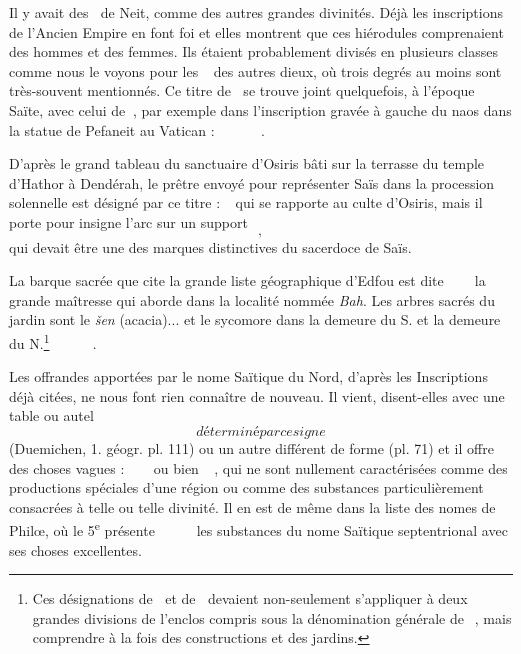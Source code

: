 \documentclass[a4paper, 11pt, oneside]{article}
\newcommand*\hieroAAAH{}
\newcommand*\hieroAAAO{}
\newcommand*\hieroAAAQ{}
\newcommand*\hieroAAAX{}
\newcommand*\hieroAABM{}
\newcommand*\hieroAABY{\raisebox{0.5ex}{}}
\newcommand*\hieroAADL{}
\newcommand*\hieroAADT{}
\newcommand*\hieroAADV{\raisebox{0.5ex}{}}
\newcommand*\hieroAAEB{}
\newcommand*\hieroAAEF{}
\newcommand*\hieroAAEK{}
\newcommand*\hieroAAEZ{}
\newcommand*\hieroAAFB{}
\newcommand*\hieroAAFH{}
\newcommand*\hieroAAFK{\raisebox{0.3ex}{}}
\newcommand*\hieroAAFL{}
\newcommand*\hieroAAFM{}
\newcommand*\hieroAAFN{\raisebox{0.5ex}{}}
\newcommand*\hieroAAFQ{}
\newcommand*\hieroAAFS{}
\newcommand*\hieroAAHA{}
\newcommand*\hieroAAHC{}
\newcommand*\hieroAAIK{}
\newcommand*\hieroAAJN{}
\newcommand*\hieroAAMP{}
\newcommand*\hieroAANA{}
\newcommand*\hieroAANP{}
\newcommand*\hieroAAOR{}
\newcommand*\hieroAAQJ{}
\newcommand*\hieroAAQK{}
\newcommand*\hieroAAQL{}
\newcommand*\hieroAAQM{}
\newcommand*\hieroAAQN{}
\newcommand*\hieroAAQO{}
\newcommand*\hieroAAQP{}
\newcommand*\hieroAAQQ{}
\newcommand*\hieroAAQR{}
\newcommand*\hieroAAQS{}
\newcommand*\hieroAAQT{}
\newcommand*\hieroAAQU{}
\newcommand*\hieroAAQV{}
\newcommand*\hieroAAQW{}
\newcommand*\hieroAAQX{}
\newcommand*\hieroAAQY{}
\newcommand*\hieroAAQZ{}
\newcommand*\hieroAARA{}
\newcommand*\hieroAARB{}
\newcommand*\hieroAARC{\raisebox{0.5ex}{}}
\newcommand*\hieroAARD{}
\newcommand*\hieroAARE{}
\newcommand*\hieroAARF{}
\newcommand*\hieroAARG{}
\newcommand*\hieroAARH{}
\newcommand*\hieroAARI{}
\newcommand*\hieroAARJ{}
\newcommand*\hieroAARK{\raisebox{0.5ex}{}}
\newcommand*\hieroAARL{}
\begin{document}
Il y avait des $\hieroAAEK\:\hieroAAHC$ de Neit, comme des autres grandes divinités. Déjà les inscriptions de l'Ancien Empire en font foi et elles montrent que ces hiérodules comprenaient des hommes et des femmes. Ils étaient probablement divisés en plusieurs classes comme nous le voyons pour les $\hieroAAEK\:\hieroAAHC\:\hieroAAEF$ des autres dieux, où trois degrés au moins sont très-souvent mentionnés. Ce titre de $\hieroAAEK\:\hieroAAHC$ se trouve joint quelquefois, à l'époque Saïte, avec celui de $\hieroAAOR\:\hieroAAHA$, par exemple dans l'inscription gravée à gauche du naos dans la statue de Pefaneit au Vatican : $\hieroAAOR\:\hieroAAHA\:\hieroAAEK\allowbreak\:\hieroAAHC\:\hieroAAAQ\:\hieroAAAO\allowbreak\:\hieroAAAH\:\hieroAANA
\:\hieroAADL\:\hieroAAFN\allowbreak\:\hieroAAQJ\:\hieroAAFK\allowbreak\:\hieroAAAQ\:\hieroAAAO$.

D'après le grand tableau du sanctuaire d'Osiris bâti sur la terrasse du temple d'Hathor à Dendérah, le prêtre envoyé pour représenter Saïs dans la procession solennelle est désigné par ce titre : $\hieroAAJN\:\hieroAAQK\:\hieroAAEB$ qui se rapporte au culte d'Osiris, mais il porte pour insigne l'arc sur un support $\hieroAAQL$, $\hieroAAQM$ qui devait être une des marques distinctives du sacerdoce de Saïs.

La barque sacrée que cite la grande liste géographique d'Edfou est dite $\hieroAAFS\:\hieroAAFQ\:\hieroAAQN\allowbreak\:\hieroAAFH\:\hieroAABM\:\hieroAANP\allowbreak\:\hieroAAFL\:\hieroAAFM$ la grande maîtresse qui aborde dans la localité nommée \emph{Bah}. Les arbres sacrés du jardin sont le \emph{šen} (acacia)... et le sycomore dans la demeure du S. et la demeure du N.\footnote{Ces désignations de $\hieroAAQS\:\hieroAAQT$ et de $\hieroAAQU\:\hieroAAQT$ devaient non-seulement s'appliquer à deux grandes divisions de l'enclos compris sous la dénomination générale de $\hieroAAHA\:\hieroAAAQ\:\hieroAAAO$, mais comprendre à la fois des constructions et des jardins.} $\hieroAAQO\:\hieroAAQP\:\hieroAAQQ\allowbreak\:\hieroAAAH\:\hieroAAEK\:\hieroAAQP\allowbreak\:\hieroAAQR\:\hieroAAQP\:\hieroAADV\allowbreak\:\hieroAAQS\:\hieroAAQT\allowbreak\:\hieroAAQU\:\hieroAAQV$.

Les offrandes apportées par le nome Saïtique du Nord, d'après les Inscriptions déjà citées, ne nous font rien connaître de nouveau. Il vient, disent-elles avec une table ou autel $\hieroAAQW$ déterminé par ce signe $\hieroAAQX$ (Duemichen, 1. géogr. pl. 111) ou un autre différent de forme (pl. 71) et il offre des choses vagues : $\hieroAAQY\:\hieroAAQZ\:\hieroAAMP\allowbreak\:\hieroAADV\:\hieroAAAX\allowbreak\:\hieroAAIK\:\hieroAARA$ ou bien $\hieroAARB\:\hieroAARC\allowbreak\:\hieroAARD\:\hieroAARE$, qui ne sont nullement caractérisées comme des productions spéciales d'une région ou comme des substances particulièrement consacrées à telle ou telle divinité. Il en est de même dans la liste des nomes de Philœ, où le 5\textsuperscript{e} présente $\hieroAAEZ\:\hieroAARF\:\hieroAADT\allowbreak\:\hieroAARG\:\hieroAARH\:\hieroAARI\allowbreak\:\hieroAARJ\:\hieroAABY\:\hieroAARK\allowbreak\:\hieroAAFB\:\hieroAARL$ les substances du nome Saïtique septentrional avec ses choses excellentes.
\end{document}
